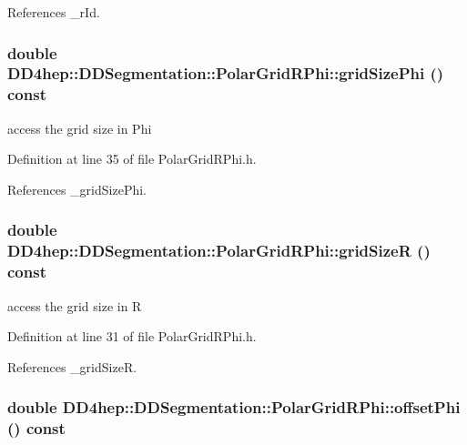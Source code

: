 References \_\-rId.\hypertarget{class_d_d4hep_1_1_d_d_segmentation_1_1_polar_grid_r_phi_a1b0b8842eae6d242c661d5322e1c0151}{
\subsubsection[{gridSizePhi}]{\setlength{\rightskip}{0pt plus 5cm}double DD4hep::DDSegmentation::PolarGridRPhi::gridSizePhi () const}}
\label{class_d_d4hep_1_1_d_d_segmentation_1_1_polar_grid_r_phi_a1b0b8842eae6d242c661d5322e1c0151}


access the grid size in Phi 

Definition at line 35 of file PolarGridRPhi.h.

References \_\-gridSizePhi.\hypertarget{class_d_d4hep_1_1_d_d_segmentation_1_1_polar_grid_r_phi_ad15c050c49a1ea4adf2929ff48830149}{
\subsubsection[{gridSizeR}]{\setlength{\rightskip}{0pt plus 5cm}double DD4hep::DDSegmentation::PolarGridRPhi::gridSizeR () const}}
\label{class_d_d4hep_1_1_d_d_segmentation_1_1_polar_grid_r_phi_ad15c050c49a1ea4adf2929ff48830149}


access the grid size in R 

Definition at line 31 of file PolarGridRPhi.h.

References \_\-gridSizeR.\hypertarget{class_d_d4hep_1_1_d_d_segmentation_1_1_polar_grid_r_phi_a9c6067462948379b0fee6e86eabfd139}{
\subsubsection[{offsetPhi}]{\setlength{\rightskip}{0pt plus 5cm}double DD4hep::DDSegmentation::PolarGridRPhi::offsetPhi () const}}
\label{class_d_d4hep_1_1_d_d_segmentation_1_1_polar_grid_r_phi_a9c6067462948379b0fee6e86eabfd139}


